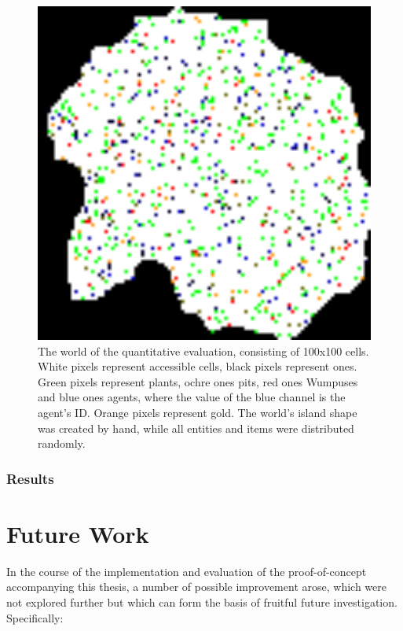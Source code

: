\begin{figure}
	\centering
	\includegraphics[width=400pt]{Figs/evalWorldQuant.png}
	\caption{The world of the quantitative evaluation, consisting of 100x100 cells. White pixels represent accessible cells, black pixels represent ones. Green pixels represent plants, ochre ones pits, red ones Wumpuses and blue ones agents, where the value of the blue channel is the agent's ID. Orange pixels represent gold. The world's island shape was created by hand, while all entities and items were distributed randomly.}
	\label{fig:evalWorldQuant}
\end{figure}

\subsubsection{Results}

\section{Future Work}\label{sec:futureWork}

In the course of the implementation and evaluation of the proof-of-concept accompanying this thesis, a number of possible improvement arose, which were not explored further but which can form the basis of fruitful future investigation. Specifically:

